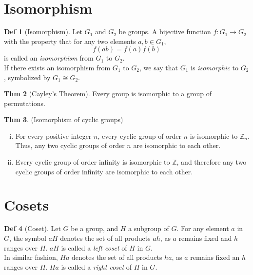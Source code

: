 \documentclass{article}
\theoremstyle{definition}
\newtheorem{definition}{Def}[section]
\newtheorem{theorem}[definition]{Thm}
\begin{document}

\section{Isomorphism}

\begin{definition}[Isomorphism]
    Let $G_1$ and $G_2$ be groups. A bijective function $f: G_1 \rightarrow G_2$ with the property that for any two elements $a, b \in G_1$,
    $$f(ab) = f(a)f(b)$$
    is called an \emph{isomorphism} from $G_1$ to $G_2$.
    \\
    If there exists an isomorphism from $G_1$ to $G_2$, we say that $G_1$ is \emph{isomorphic} to $G_2$, symbolized by $G_1 \cong G_2$.
\end{definition}


\begin{theorem}[Cayley's Theorem]
    Every group is isomorphic to a group of permutations.
\end{theorem}

\begin{theorem}
    (Isomorphism of cyclic groups)
    \begin{enumerate}[i.]
	\item For every positive integer $n$, every cyclic group of order $n$ is isomorphic to $\mathbb{Z}_n$. Thus, any two cyclic groups of order $n$ are isomorphic to each other.
	\item Every cyclic group of order infinity is isomorphic to $\mathbb{Z}$, and therefore any two cyclic groups of order infinity are isomorphic to each other.
    \end{enumerate}
\end{theorem}

\section{Cosets}

\begin{definition}[Coset]
    Let $G$ be a group, and $H$ a subgroup of $G$. For any element $a$ in $G$, the symbol $aH$ denotes the set of all products $ah$, as $a$ remains fixed and $h$ ranges over $H$. $aH$ is called a \emph{left coset} of $H$ in $G$.
    \\
    In similar fashion, $Ha$ denotes the set of all products $ha$, as $a$ remains fixed an $h$ ranges over $H$. $Ha$ is called a \emph{right coset} of $H$ in $G$.
\end{definition}
\end{document}
